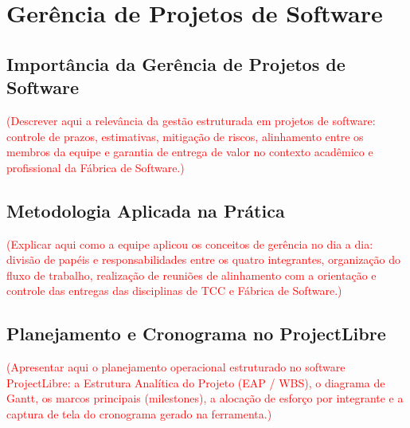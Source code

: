 \section{Gerência de Projetos de Software}

\subsection{Importância da Gerência de Projetos de Software}

\textcolor{red}{(Descrever aqui a relevância da gestão estruturada em projetos de software: controle de prazos, estimativas, mitigação de riscos, alinhamento entre os membros da equipe e garantia de entrega de valor no contexto acadêmico e profissional da Fábrica de Software.)}

\subsection{Metodologia Aplicada na Prática}

\textcolor{red}{(Explicar aqui como a equipe aplicou os conceitos de gerência no dia a dia: divisão de papéis e responsabilidades entre os quatro integrantes, organização do fluxo de trabalho, realização de reuniões de alinhamento com a orientação e controle das entregas das disciplinas de TCC e Fábrica de Software.)}

\subsection{Planejamento e Cronograma no ProjectLibre}

\textcolor{red}{(Apresentar aqui o planejamento operacional estruturado no software ProjectLibre: a Estrutura Analítica do Projeto (EAP / WBS), o diagrama de Gantt, os marcos principais (milestones), a alocação de esforço por integrante e a captura de tela do cronograma gerado na ferramenta.)}
